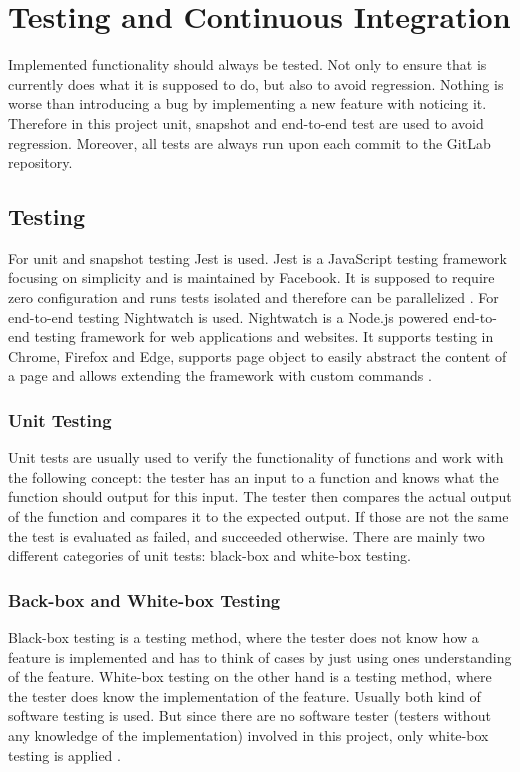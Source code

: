 \chapter{Testing and Continuous Integration}
\label{chapter:testingAndCI}

Implemented functionality should always be tested. Not only to ensure that is currently does what it is supposed to do, but also to avoid regression. Nothing is worse than introducing a bug by implementing a new feature with noticing it. Therefore in this project unit, snapshot and end-to-end test are used to avoid regression.
Moreover, all tests are always run upon each commit to the GitLab repository.

\section{Testing}
\label{section:testing}
For unit and snapshot testing Jest is used. Jest is a JavaScript testing framework focusing on simplicity and is maintained by Facebook. It is supposed to require zero configuration and runs tests isolated and therefore can be parallelized \cite{Jest}. For end-to-end testing Nightwatch is used. Nightwatch is a Node.js powered end-to-end testing framework for web applications and websites. It supports testing in Chrome, Firefox and Edge, supports page object to easily abstract the content of a page and allows extending the framework with custom commands \cite{Nightwatch}.

\subsection{Unit Testing}
\label{subsection:unitTesting}
Unit tests are usually used to verify the functionality of functions and work with the following concept: the tester has an input to a function and knows what the function should output for this input. The tester then compares the actual output of the function and compares it to the expected output. If those are not the same the test is evaluated as failed, and succeeded otherwise.
There are mainly two different categories of unit tests: black-box and white-box testing.

\subsection*{Back-box and White-box Testing}
Black-box testing is a testing method, where the tester does not know how a feature is implemented and has to think of cases by just using ones understanding of the feature. White-box testing on the other hand is a testing method, where the tester does know the implementation of the feature. Usually both kind of software testing is used. But since there are no software tester  (testers without any knowledge of the implementation) involved in this project, only white-box testing is applied \cite{BlackBoxWhiteBoxTesting}.

